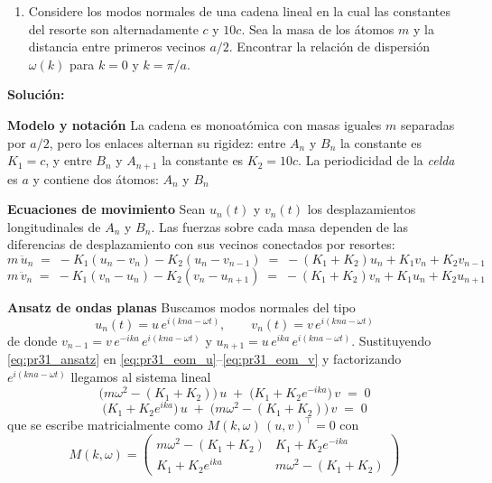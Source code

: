 \documentclass{article}
\newenvironment{AGbox}[1][7]%
{%
  \begin{tcolorbox}[
    enhanced, breakable,
    colframe=AppleGreen,
    colback=AppleGreen!#1,
    boxrule=1pt,
    borderline west={2mm}{-10mm}{AppleGreen},
    sharp corners=southwest,
    left=14pt,right=14pt,top=10pt,bottom=10pt,
     boxsep=6pt,
  ]%
}{%
  \end{tcolorbox}%
}
\begin{document}
\begin{AGbox}[8]
\begin{enumerate}[label={{\textcolor{trueblue}{\textbf{Pr.} \arabic*.1}}}, start=1]
  \item Considere los modos normales de una cadena lineal en la cual las constantes del resorte son alternadamente $c$ y $10c$. Sea la masa de los átomos $m$ y la distancia entre primeros vecinos $a/2$. Encontrar la relación de dispersión $\omega(k)$ para $k = 0$ y $k = \pi / a$.
\end{enumerate}
\end{AGbox}

\textcolor{Cinnabar}{\textbf{Solución:}}

\noindent\textbf{Modelo y notación}\; La cadena es monoatómica con masas iguales $m$ separadas por $a/2$, pero los enlaces alternan su rigidez: entre $A_n$ y $B_n$ la constante es $K_1=c$, y entre $B_n$ y $A_{n+1}$ la constante es $K_2=10c$. La periodicidad de la \emph{celda} es $a$ y contiene dos átomos: $A_n$ y $B_n$

\noindent\textbf{Ecuaciones de movimiento}\;
Sean $u_n(t)$ y $v_n(t)$ los desplazamientos longitudinales de $A_n$ y $B_n$. Las fuerzas sobre cada masa dependen de las diferencias de desplazamiento con sus vecinos conectados por resortes:
\begin{equation}
m\,\ddot u_n \;=\; -K_1(u_n - v_n) - K_2(u_n - v_{n-1}) \;=\; -(K_1+K_2)u_n + K_1 v_n + K_2 v_{n-1}
\label{eq:pr31_eom_u}
\end{equation}
\begin{equation}
m\,\ddot v_n \;=\; -K_1(v_n - u_n) - K_2(v_n - u_{n+1}) \;=\; -(K_1+K_2)v_n + K_1 u_n + K_2 u_{n+1}
\label{eq:pr31_eom_v}
\end{equation}

\noindent\textbf{Ansatz de ondas planas}\;
Buscamos modos normales del tipo
\begin{equation}
u_n(t)=u\,e^{i(kna-\omega t)}, \qquad v_n(t)=v\,e^{i(kna-\omega t)}
\label{eq:pr31_ansatz}
\end{equation}
de donde $v_{n-1}=v\,e^{-ika}\,e^{i(kna-\omega t)}$ y $u_{n+1}=u\,e^{ika}\,e^{i(kna-\omega t)}$. Sustituyendo \eqref{eq:pr31_ansatz} en \eqref{eq:pr31_eom_u}–\eqref{eq:pr31_eom_v} y factorizando $e^{i(kna-\omega t)}$ llegamos al sistema lineal
\begin{equation}
\big(m\omega^2 - (K_1+K_2)\big)\,u \;+\; \big(K_1 + K_2 e^{-ika}\big)\,v \;=\; 0
\label{eq:pr31_mat1}
\end{equation}
\begin{equation}
\big(K_1 + K_2 e^{ika}\big)\,u \;+\; \big(m\omega^2 - (K_1+K_2)\big)\,v \;=\; 0
\label{eq:pr31_mat2}
\end{equation}
que se escribe matricialmente como $M(k,\omega)\,(u,v)^{\top}=0$ con
\[
M(k,\omega)=
\begin{pmatrix}
m\omega^2-(K_1+K_2) & K_1 + K_2 e^{-ika}\\
K_1 + K_2 e^{ika}   & m\omega^2-(K_1+K_2)
\end{pmatrix}
\]
\end{document}
